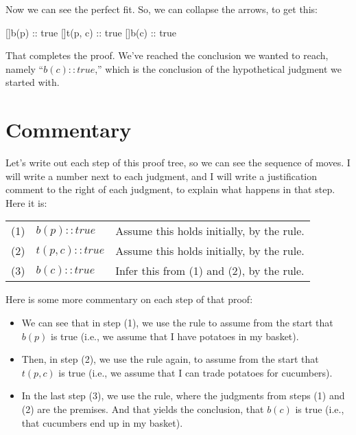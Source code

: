 \documentclass[../../../main.tex]{subfiles}
\begin{document}
\noindent
Now we can see the perfect fit. So, we can collapse the arrows, to get this:

\begin{prooftree*}
  \hypo{}
  []{b(p) :: true}
  \hypo{}
  []{t(p, c) :: true}
  []{b(c) :: true}
\end{prooftree*}

\noindent
That completes the proof. We've reached the conclusion we wanted to reach, namely ``$b(c) :: true$,'' which is the conclusion of the hypothetical judgment we started with. 


\section{Commentary}

Let's write out each step of this proof tree, so we can see the sequence of moves. I will write a number next to each judgment, and I will write a justification comment to the right of each judgment, to explain what happens in that step. Here it is:

\begin{center}
\begin{tabular}{l  l  l}
  (1) & $b(p) :: true$ & Assume this holds initially, by the {start} rule. \\
  (2) & $t(p, c) :: true$ & Assume this holds initially, by the {start} rule. \\
  (3) & $b(c) :: true$ & Infer this from (1) and (2), by the {trade} rule.
\end{tabular}
\end{center}

\noindent
Here is some more commentary on each step of that proof:

\begin{itemize}
  \item{We can see that in step (1), we use the  rule to assume from the start that $b(p)$ is true (i.e., we assume that I have potatoes in my basket).}
  \item{Then, in step (2), we use the  rule again, to assume from the start that $t(p, c)$ is true (i.e., we assume that I can trade potatoes for cucumbers).}
  \item{In the last step (3), we use the  rule, where the judgments from steps (1) and (2) are the premises. And that yields the conclusion, that $b(c)$ is true (i.e., that cucumbers end up in my basket).}
\end{itemize}
\end{document}
